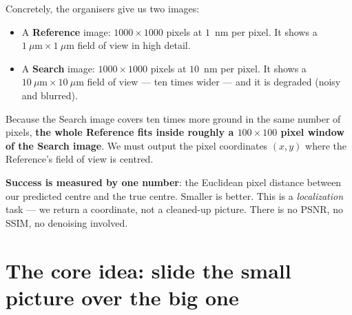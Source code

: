 \documentclass[11pt]{article}
\newcommand{\term}[1]{\textbf{\color{klablue}#1}}
\begin{document}
Concretely, the organisers give us two images:

\begin{itemize}[leftmargin=1.4em]
  \item A \term{Reference} image: $1000\times1000$ pixels at $1$~nm per pixel.
        It shows a $1~\mu\text{m}\times1~\mu\text{m}$ field of view in high detail.
  \item A \term{Search} image: $1000\times1000$ pixels at $10$~nm per pixel.
        It shows a $10~\mu\text{m}\times10~\mu\text{m}$ field of view --- ten
        times wider --- and it is degraded (noisy and blurred).
\end{itemize}

Because the Search image covers ten times more ground in the same number of
pixels, \term{the whole Reference fits inside roughly a $100\times100$ pixel
window of the Search image}. We must output the pixel coordinates
$(x,y)$ where the Reference's field of view is centred.

\term{Success is measured by one number}: the Euclidean pixel distance
between our predicted centre and the true centre. Smaller is better. This is
a \emph{localization} task --- we return a coordinate, not a cleaned-up
picture. There is no PSNR, no SSIM, no denoising involved.

\begin{center}
\end{center}

\section{The core idea: slide the small picture over the big one}
\label{sec:ncc}
\end{document}
